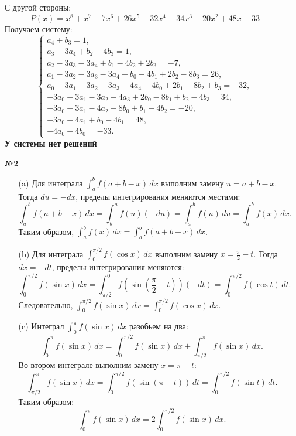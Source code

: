 \documentclass[a4paper]{article}
\begin{document}
\begin{enumerate}
    С другой стороны:
    \[
    P(x) = x^8 + x^7 - 7x^6 + 26x^5 - 32x^4 + 34x^3 - 20x^2 + 48x - 33
    \]
    Получаем систему:
    \[
    \begin{cases}
    a_4 + b_3 = 1,\\
    a_3 - 3a_4 + b_2 - 4b_3 = 1,\\
    a_2 - 3a_3 - 3a_4 + b_1 - 4b_2 + 2b_3 = -7,\\
    a_1 - 3a_2 - 3a_3 - 3a_4 + b_0 - 4b_1 + 2b_2 - 8b_3 = 26,\\
    a_0 - 3a_1 - 3a_2 - 3a_3 - 4a_4 - 4b_0 + 2b_1 - 8b_2 + b_3 = -32,\\
    -3a_0 - 3a_1 - 3a_2 - 4a_3 + 2b_0 - 8b_1 + b_2 - 4b_3 = 34,\\
    -3a_0 - 3a_1 - 4a_2 - 8b_0 + b_1 - 4b_2 = -20,\\
    -3a_0 - 4a_1 + b_0 - 4b_1 = 48,\\
    -4a_0 - 4b_0 = -33.
    \end{cases}
    \]
    \textbf{У системы нет решений}\\

    \item[\textbf{№2}]\begin{enumerate}
        \item[(a)] Для интеграла \(\int_a^b f(a + b - x) \, dx\) выполним замену \(u = a + b - x\). Тогда \(du = -dx\), пределы интегрирования меняются местами:  
        \[
        \int_a^b f(a + b - x) \, dx = \int_b^a f(u) (-du) = \int_a^b f(u) \, du = \int_a^b f(x) \, dx.
        \]  
        Таким образом, \(\int_a^b f(x) \, dx = \int_a^b f(a + b - x) \, dx\).\\

        \item[(b)]Для интеграла \(\int_0^{\pi/2} f(\cos x) \, dx\) выполним замену \(x = \frac{\pi}{2} - t\). Тогда \(dx = -dt\), пределы интегрирования меняются:  
        \[
        \int_0^{\pi/2} f(\sin x) \, dx = \int_{\pi/2}^0 f\left(\sin\left(\frac{\pi}{2} - t\right)\right) (-dt) = \int_0^{\pi/2} f(\cos t) \, dt.
        \]  
        Следовательно, \(\int_0^{\pi/2} f(\sin x) \, dx = \int_0^{\pi/2} f(\cos x) \, dx\).\\
        
        \item[(c)]Интеграл \(\int_0^{\pi} f(\sin x) \, dx\) разобьем на два:  
        \[
        \int_0^{\pi} f(\sin x) \, dx = \int_0^{\pi/2} f(\sin x) \, dx + \int_{\pi/2}^{\pi} f(\sin x) \, dx.
        \]  
        Во втором интеграле выполним замену \(x = \pi - t\):  
        \[
        \int_{\pi/2}^{\pi} f(\sin x) \, dx = \int_0^{\pi/2} f(\sin(\pi - t)) \, dt = \int_0^{\pi/2} f(\sin t) \, dt.
        \]  
        Таким образом:  
        \[
        \int_0^{\pi} f(\sin x) \, dx = 2 \int_0^{\pi/2} f(\sin x) \, dx.
        \]\\


\end{enumerate}
\end{enumerate}
\end{document}
